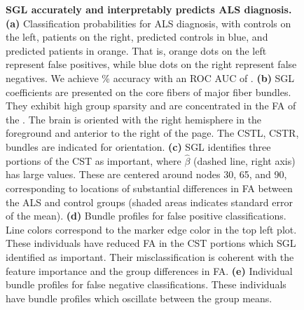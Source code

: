 \documentclass[10pt,letterpaper]{article}
\begin{document}
\begin{figure}[t!]
    {\label{fig:class-results:probs}}
    {\label{fig:class-results:coefs3d}}
    {\label{fig:class-results:tract-profiles}}
    {\label{fig:class-results:false-positives}}
    {\label{fig:class-results:false-negatives}}
    \caption{%
        {\bf {}SGL accurately and interpretably predicts ALS diagnosis.}
        \label{fig:class-results}
        {\bf (a)} Classification probabilities for ALS diagnosis, with
        controls on the left, patients on the right, predicted controls in
        blue, and predicted patients in orange. That is, orange dots on the left
        represent false positives, while blue dots on the right represent
        false negatives. We achieve {\protect\alsAccuracy}\% accuracy with an
        ROC AUC of {\protect\alsRocAuc}.
        {\bf (b)} SGL coefficients are presented on the core fibers of major
        fiber bundles. They exhibit high group sparsity and are concentrated
        in the FA of the .
        The brain is oriented with the right hemisphere
        in the foreground and anterior to the right of the page. The CSTL, CSTR,
        bundles are indicated for orientation.
        {\bf (c)} SGL identifies three portions of the CST as important,
        where $\hat{\beta}$ (dashed line, right axis) has large values. These
        are centered around nodes 30, 65, and 90, corresponding to locations
        of substantial differences in FA between the ALS and control groups
        (shaded areas indicates standard error of the mean).
        {\bf (d)} Bundle profiles for false positive classifications. Line
        colors correspond to the marker edge color in the top left plot.
        These individuals have reduced FA in the CST portions which SGL
        identified as important. Their misclassification is coherent with the
        feature importance and the group differences in FA.
        {\bf (e)} Individual bundle profiles for false negative
        classifications. These individuals have bundle profiles which
        oscillate between the group means.
    }
\end{figure}
\end{document}

